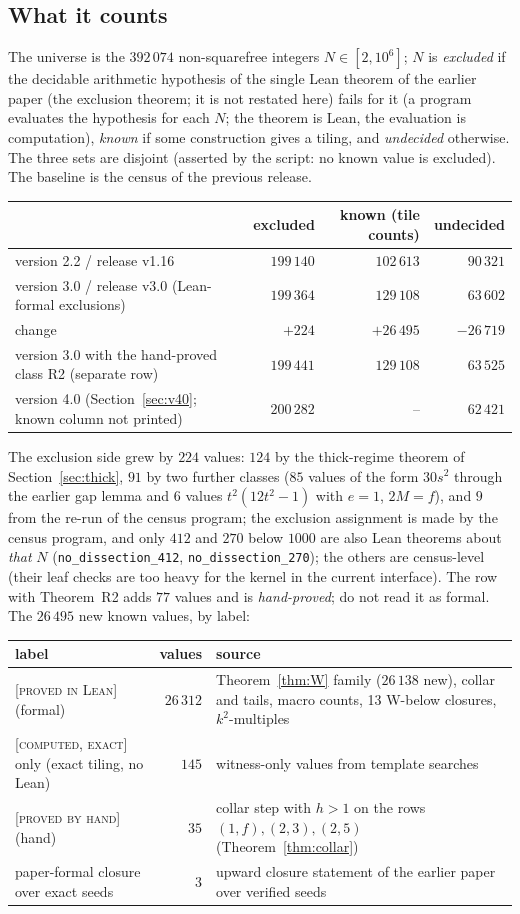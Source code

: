 \documentclass[11pt,reqno]{amsart}
\theoremstyle{plain}
\theoremstyle{definition}
\newcommand{\lab}[1]{\textup{[\textsc{#1}]}}
\newcommand{\PL}{\lab{proved in Lean}}
\newcommand{\PH}{\lab{proved by hand}}
\newcommand{\CE}{\lab{computed, exact}}
\begin{document}
\subsection{What it counts}
The universe is the $392\,074$ non-squarefree integers $N\in[2,10^6]$; $N$ is \emph{excluded} if the decidable arithmetic hypothesis of the single Lean theorem of the earlier paper (the exclusion theorem; it is not restated here) fails for it (a program evaluates the hypothesis for each $N$; the theorem is Lean, the evaluation is computation), \emph{known} if some construction gives a tiling, and \emph{undecided} otherwise.
The three sets are disjoint (asserted by the script: no known value is excluded).
The baseline is the census of the previous release.
\begin{center}\small
\begin{tabular}{@{}lrrr@{}}
\toprule
 & excluded & known (tile counts) & undecided\\
\midrule
version 2.2 / release v1.16 & $199\,140$ & $102\,613$ & $90\,321$\\
version 3.0 / release v3.0 (Lean-formal exclusions) & $199\,364$ & $129\,108$ & $63\,602$\\
change & $+224$ & $+26\,495$ & $-26\,719$\\
version 3.0 with the hand-proved class R2 (separate row) & $199\,441$ & $129\,108$ & $63\,525$\\
version 4.0 (Section~\ref{sec:v40}; known column not printed) & $200\,282$ & -- & $62\,421$\\
\bottomrule
\end{tabular}
\end{center}
The exclusion side grew by $224$ values: $124$ by the thick-regime theorem of Section~\ref{sec:thick}, $91$ by two further classes ($85$ values of the form $30s^2$ through the earlier gap lemma and $6$ values $t^2(12t^2-1)$ with $e=1$, $2M=f$), and $9$ from the re-run of the census program; the exclusion assignment is made by the census program, and only $412$ and $270$ below $1000$ are also Lean theorems about \emph{that} $N$ (\texttt{no\_dissection\_412}, \texttt{no\_dissection\_270}); the others are census-level (their leaf checks are too heavy for the kernel in the current interface). The row with Theorem~R2 adds $77$ values and is \emph{hand-proved}; do not read it as formal. The $26\,495$ new known values, by label:
\begin{center}\small
\begin{tabular}{@{}p{4.6cm}rp{6.0cm}@{}}
\toprule
label & values & source\\
\midrule
\PL{} (formal) & $26\,312$ & Theorem~\ref{thm:W} family ($26\,138$ new), collar and tails, macro counts, 13 W-below closures, $k^2$-multiples\\
\CE{} only (exact tiling, no Lean) & $145$ & witness-only values from template searches\\
\PH{} (hand) & $35$ & collar step with $h>1$ on the rows $(1,f),(2,3),(2,5)$ (Theorem~\ref{thm:collar})\\
paper-formal closure over exact seeds & $3$ & upward closure statement of the earlier paper over verified seeds\\
\bottomrule
\end{tabular}
\end{center}
\end{document}
